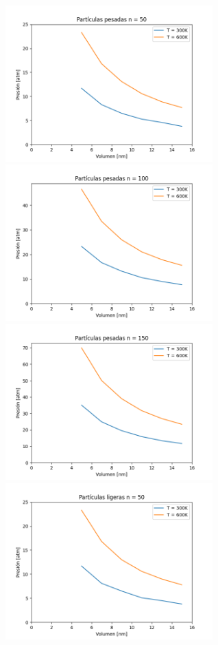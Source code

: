 \documentclass[]{article}
\begin{document}
\begin{figure}[H]
    \begin{subfigure}
    		\raggedright
     	\includegraphics[width=8cm, height=6cm]{graficos/grafico1.pdf}
    \end{subfigure}
    	\begin{subfigure}
    		\raggedright
    		\includegraphics[width=8cm, height=6cm]{graficos/grafico2.pdf}
    	\end{subfigure}
    \begin{subfigure}
    		\raggedright
    		\includegraphics[width=8cm, height=6cm]{graficos/grafico3.pdf}
    	\end{subfigure}
    	\begin{subfigure}
    		\raggedright
    		\includegraphics[width=8cm, height=6cm]{graficos/grafico4.pdf}

\end{subfigure}
\end{figure}
\end{document}
